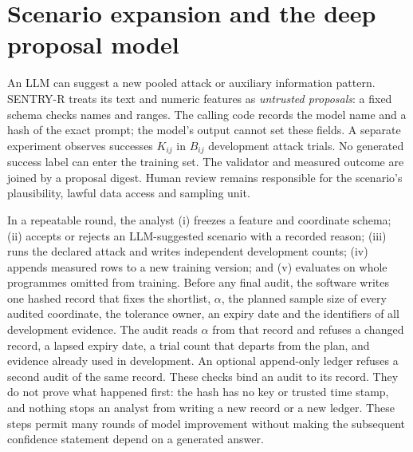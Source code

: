 \documentclass[10pt,a4paper]{article}
\theoremstyle{plain}
\begin{document}
\section{Scenario expansion and the deep proposal model}

An LLM can suggest a new pooled attack or auxiliary information pattern.
SENTRY-R treats its text and numeric features as \emph{untrusted proposals}:
a fixed schema checks names and ranges. The calling code records the model
name and a hash of the exact prompt; the model's output cannot set these
fields.
A separate experiment observes successes $K_{ij}$ in $B_{ij}$ development
attack trials. No generated success label can enter the training set.
The validator and measured outcome are joined by a proposal digest. Human
review remains responsible for the scenario's plausibility, lawful data access
and sampling unit.

In a repeatable round, the analyst (i) freezes a feature and coordinate schema;
(ii) accepts or rejects an LLM-suggested scenario with a recorded reason;
(iii) runs the declared attack and writes independent development counts;
(iv) appends measured rows to a new training version; and (v) evaluates on
whole programmes omitted from training. Before any final audit, the software
writes one hashed record that fixes the shortlist, $\alpha$, the planned
sample size of every audited coordinate, the tolerance owner, an expiry date
and the identifiers of all development evidence. The audit reads $\alpha$
from that record and refuses a changed record, a lapsed expiry date, a trial
count that departs from the plan, and evidence already used in development.
An optional append-only ledger refuses a second audit of the same record.
These checks bind an audit to its record. They do not prove what happened
first: the hash has no key or trusted time stamp, and nothing stops an
analyst from writing a new record or a new ledger. These steps permit many rounds of
model improvement without making the subsequent confidence statement depend
on a generated answer.
\end{document}
